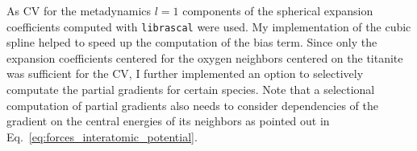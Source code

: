 As CV for the metadynamics $l=1$ components of the spherical expansion coefficients computed with \texttt{librascal} were used.
My implementation of the cubic spline helped to speed up the computation of the bias term.
Since only the expansion coefficients centered for the oxygen neighbors centered on the titanite was sufficient for the CV, I further implemented an option to selectively computate the partial gradients for certain species.
Note that a selectional computation of partial gradients also needs to consider dependencies of the gradient on the central energies of its neighbors as pointed out in Eq.~\ref{eq:forces_interatomic_potential}.


